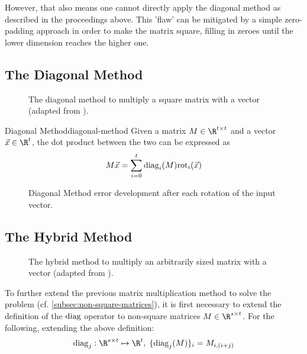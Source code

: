 However, that also means one cannot directly apply the diagonal method as described in the proceedings above.
This 'flaw' can be mitigated by a simple zero-padding approach in order to make the matrix square, filling in zeroes until the lower dimension reaches the higher one.

\subsection{The Diagonal Method}
\begin{figure}[H]
  \centering
  \caption[Diagonal matrix multiplication method]{The diagonal method to multiply a square matrix with a vector (adapted from \cite{2018-gazelle}).}
\end{figure}


\begin{theorem}{Diagonal Method}{diagonal-method}
  Given a matrix $M \in \R^{t \times t}$ and a vector $\vec{x} \in \R^t$,
  the dot product between the two can be expressed as
  \begin{equation*}
    M \vec{x} = \sum_{i=0}^t \mathrm{diag}_i(M) \mathrm{rot}_i(\vec{x})
  \end{equation*}
\end{theorem}

\begin{figure}[H]
  \centering
  \pgfplotsset{/pgfplots/group/.cd,vertical sep=2.0cm}
  \caption[Error development after rotations of the diagonal method]{Diagonal Method error development after each rotation of the input vector.}
  \label{fig:rotation-error}
\end{figure}


\subsection{The Hybrid Method}
\begin{figure}[H]
  \centering
  \caption[Hybrid matrix multiplication method]{The hybrid method to multiply an arbitrarily sized matrix with a vector (adapted from \cite{2018-gazelle}).}
\end{figure}
To further extend the previous matrix multiplication method to solve the problem
(cf. \cref{subsec:non-square-matrices}), it is first necessary to extend the definition of the $\mathrm{diag}$ operator to non-square matrices $M \in \R^{s \times t}$.
For the following, extending the above definition:
$$\diag_j: \R^{s \times t} \mapsto \R^t, \; \{\diag_j(M)\}_i = M_{i, (i+j)}$$

